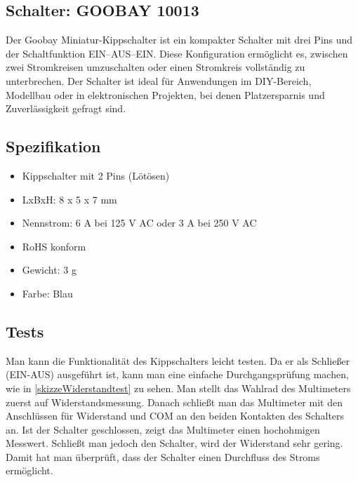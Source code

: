 \subsection{Schalter: GOOBAY 10013}
Der Goobay Miniatur-Kippschalter ist ein kompakter Schalter mit drei Pins und der Schaltfunktion EIN–AUS–EIN. Diese Konfiguration ermöglicht es, zwischen zwei Stromkreisen umzuschalten oder einen Stromkreis vollständig zu unterbrechen. Der Schalter ist ideal für Anwendungen im DIY-Bereich, Modellbau oder in elektronischen Projekten, bei denen Platzersparnis und Zuverlässigkeit gefragt sind. \cite{NKKswitches:2025} \cite{Goobay:2023} \cite{ReicheltKipp:2025}

\subsection{Spezifikation}
\begin{itemize}
	\item Kippschalter mit 2 Pins (Lötösen)
	\item LxBxH: 8 x 5 x 7 mm
	\item Nennstrom: 6 A bei 125 V AC oder 3 A bei 250 V AC
	\item RoHS konform
	\item Gewicht: 3 g
	\item Farbe: Blau
\end{itemize}

\subsection{Tests}
Man kann die Funktionalität des Kippschalters leicht testen. Da er als Schließer (EIN-AUS) ausgeführt ist, kann man eine einfache Durchgangsprüfung machen, wie in \ref{skizzeWiderstandtest} zu sehen. Man stellt das Wahlrad des Multimeters zuerst auf Widerstandsmessung. Danach schließt man das Multimeter mit den Anschlüssen für Widerstand und COM an den beiden Kontakten des Schalters an. Ist der Schalter geschlossen, zeigt das Multimeter einen hochohmigen Messwert. Schließt man jedoch den Schalter, wird der Widerstand sehr gering. Damit hat man überprüft, dass der Schalter einen Durchfluss des Stroms ermöglicht.\cite{NKKswitches:2025} \cite{Fluke:2025}

